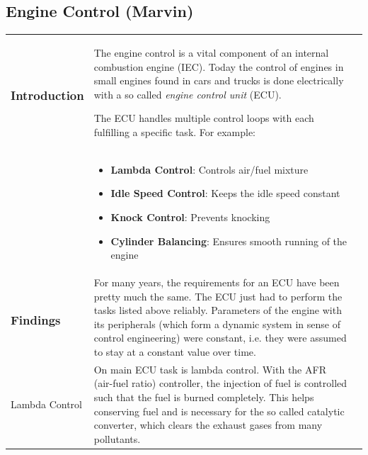 \documentclass[12pt,a4paper,numbers=noenddot]{scrartcl}
\begin{document}
\newpage
\subsection{Engine Control (Marvin)}
\begin{xtabular}{|p{3.8cm}|p{8.3cm}|p{4.2cm}|}
	\vspace*{-1.25\baselineskip}
	\subsubsection{Introduction}
	&
	The engine control is a vital component of an internal combustion engine (IEC). Today the control of engines in small engines found in cars and trucks is done electrically with a so called \textit{engine control unit} (ECU).
	
	The ECU handles multiple control loops with each fulfilling a specific task. For example:
	& 
	\\
	&
	\begin{itemize}
		\item \textbf{Lambda Control}: Controls air/fuel mixture
		\item \textbf{Idle Speed Control}: Keeps the idle speed constant
		\item \textbf{Knock Control}: Prevents knocking
		\item \textbf{Cylinder Balancing}: Ensures smooth running of the engine
	\end{itemize}
	&
	\\
	\vspace*{-1.25\baselineskip}
	\subsubsection{Findings}
	&
	For many years, the requirements for an ECU have been pretty much the same. The ECU just had to perform the tasks listed above reliably. Parameters of the engine with its peripherals (which form a dynamic system in sense of control engineering) were constant, i.e. they were assumed to stay at a constant value over time. 
	&
	
	\\
	Lambda Control
	&
	On main ECU task is lambda control. With the AFR (air-fuel ratio) controller, the injection of fuel is controlled such that the fuel is burned completely. This helps conserving fuel and is necessary for the so called catalytic converter, which clears the exhaust gases from many pollutants.
	

\end{xtabular}
\end{document}
